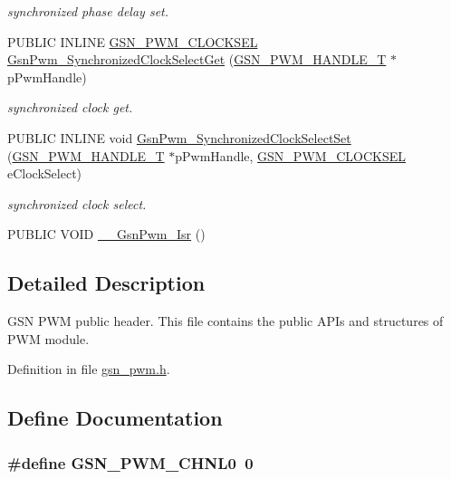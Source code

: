 \begin{DoxyCompactItemize}
\begin{DoxyCompactList}\small\item\em synchronized phase delay set. \end{DoxyCompactList}\item 
PUBLIC INLINE \hyperlink{a00650_gafda5110eb592af71b799ed22c7ebf902}{GSN\_\-PWM\_\-CLOCKSEL} \hyperlink{a00650_gaabf0051a6ce2882eb1a734c029c7d4b9}{GsnPwm\_\-SynchronizedClockSelectGet} (\hyperlink{a00182}{GSN\_\-PWM\_\-HANDLE\_\-T} $\ast$pPwmHandle)
\begin{DoxyCompactList}\small\item\em synchronized clock get. \end{DoxyCompactList}\item 
PUBLIC INLINE void \hyperlink{a00650_ga177c51254727205e45ddd643abd59b14}{GsnPwm\_\-SynchronizedClockSelectSet} (\hyperlink{a00182}{GSN\_\-PWM\_\-HANDLE\_\-T} $\ast$pPwmHandle, \hyperlink{a00650_gafda5110eb592af71b799ed22c7ebf902}{GSN\_\-PWM\_\-CLOCKSEL} eClockSelect)
\begin{DoxyCompactList}\small\item\em synchronized clock select. \end{DoxyCompactList}\item 
PUBLIC VOID \hyperlink{a00540_a2f1f4ac54f2ee84ac0707e06f8e88105}{\_\-\_\-GsnPwm\_\-Isr} ()
\end{DoxyCompactItemize}


\subsection{Detailed Description}
GSN PWM public header. This file contains the public APIs and structures of PWM module. 

Definition in file \hyperlink{a00540_source}{gsn\_\-pwm.h}.



\subsection{Define Documentation}
\hypertarget{a00540_a0205531029f293297fd611e1833e2639}{
\subsubsection[{GSN\_\-PWM\_\-CHNL0}]{\setlength{\rightskip}{0pt plus 5cm}\#define GSN\_\-PWM\_\-CHNL0~0}}
\label{a00540_a0205531029f293297fd611e1833e2639}


